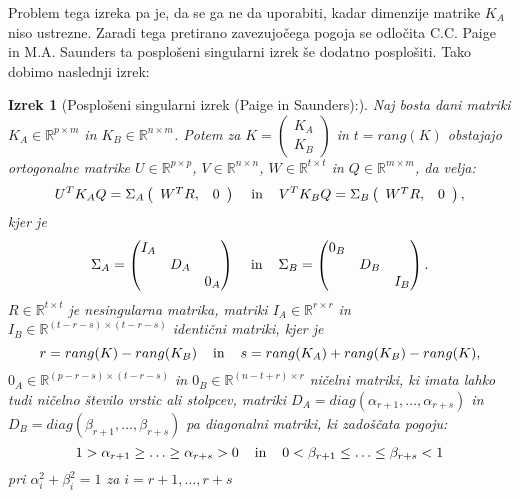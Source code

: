 \documentclass[mat1]{article}
\newtheorem{izrek}{Izrek}
\begin{document}
Problem tega izreka pa je, da se ga ne da uporabiti, kadar dimenzije matrike $K_A$ niso ustrezne. Zaradi tega pretirano zavezujočega pogoja se odločita C.C. Paige in M.A. Saunders ta posplošeni singularni izrek še dodatno posplošiti. Tako dobimo naslednji izrek:
\begin{izrek}[Posplošeni singularni izrek (Paige in Saunders):]
\label{izrek:GSVD} Naj bosta dani matriki $K_A \in \mathbb{R}^{p \times m}$ in $K_B \in \mathbb{R}^{n \times m}$. Potem za $K = \left(\begin{array}{c} K_A \\ K_B \end{array}\right)$ in $t = rang(K)$ obstajajo ortogonalne matrike $U \in \mathbb{R}^{p \times p}$, $V \in \mathbb{R}^{n \times n}$, $W \in \mathbb{R}^{t \times t}$ in $Q \in \mathbb{R}^{m \times m}$, da velja: 
$$U^T K_A Q = \Sigma_A  \left(\begin{array}{cc} W^T R, & 0 \end{array}\right) \hspace{4mm} \text{in} \hspace{4mm} V^T K_B Q = \Sigma_B  \left(\begin{array}{cc} W^T R, & 0 \end{array}\right),$$ kjer je 
$$\Sigma_A = \begin{pmatrix} 
I_A &  & \\
 & D_A & \\
 & & 0_A  
\end{pmatrix} \hspace{4mm} \text{in} \hspace{4mm}
\Sigma_B = \begin{pmatrix} 
0_B &  & \\
 & D_B & \\
 & & I_B  
\end{pmatrix}.$$ 
$R \in \mathbb{R}^{t \times t}$ je nesingularna matrika, matriki $I_A \in \mathbb{R}^{r \times r}$ in $I_B \in \mathbb{R}^{(t-r-s) \times (t-r-s)}$ identični matriki, kjer je 
$$r = rang(K) - rang(K_B) \hspace{4mm} \text{in} \hspace{4mm} s = rang(K_A) + rang(K_B) - rang(K),$$
$0_A \in \mathbb{R}^{(p-r-s) \times (t-r-s)}$ in $0_B \in \mathbb{R}^{(n-t+r) \times r}$ ničelni matriki, ki imata lahko tudi ničelno število vrstic ali stolpcev, matriki
$D_A = diag(\alpha_{r+1},..., \alpha_{r+s})$ in $D_B = diag(\beta_{r+1},..., \beta_{r+s})$ pa diagonalni matriki, ki zadoščata pogoju:
$$1 > \alpha_{r+1} \geq \ldots \geq \alpha_{r+s} > 0 \hspace{4mm} \text{in} \hspace{4mm} 0 < \beta_{r+1} \leq \ldots \leq \beta_{r+s} < 1$$
pri $\alpha_i^2 + \beta_i^2 = 1$ za $ i = r+1,\ldots, r+s$
\end{izrek}
\end{document}
